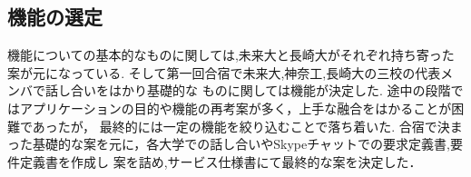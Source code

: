 \subsection{機能の選定}
\par
機能についての基本的なものに関しては,未来大と長崎大がそれぞれ持ち寄った案が元になっている. 
そして第一回合宿で未来大,神奈工,長崎大の三校の代表メンバで話し合いをはかり基礎的な
ものに関しては機能が決定した.
途中の段階ではアプリケーションの目的や機能の再考案が多く，上手な融合をはかることが困難であったが，
最終的には一定の機能を絞り込むことで落ち着いた. 
合宿で決まった基礎的な案を元に，各大学での話し合いやSkypeチャットでの要求定義書,要件定義書を作成し
案を詰め,サービス仕様書にて最終的な案を決定した．
